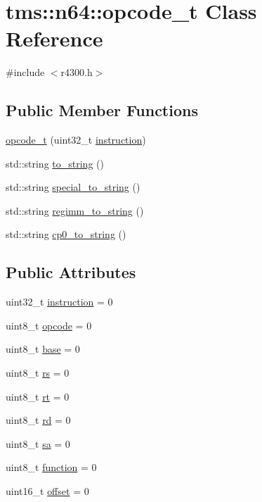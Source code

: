 \hypertarget{classtms_1_1n64_1_1opcode__t}{}\section{tms\+:\+:n64\+:\+:opcode\+\_\+t Class Reference}
\label{classtms_1_1n64_1_1opcode__t}


{\ttfamily \#include $<$r4300.\+h$>$}

\subsection*{Public Member Functions}
\begin{DoxyCompactItemize}
\item 
\hyperlink{classtms_1_1n64_1_1opcode__t_a507801bea9f0304881b0df6ab06778a8}{opcode\+\_\+t} (uint32\+\_\+t \hyperlink{classtms_1_1n64_1_1opcode__t_ac829461bde29e27600f04acdbe811b93}{instruction})
\item 
std\+::string \hyperlink{classtms_1_1n64_1_1opcode__t_ae87f3baac42ff04e2764c2e0e3d90993}{to\+\_\+string} ()
\item 
std\+::string \hyperlink{classtms_1_1n64_1_1opcode__t_a9f846a7b922c7d5adc6a800272bf1718}{special\+\_\+to\+\_\+string} ()
\item 
std\+::string \hyperlink{classtms_1_1n64_1_1opcode__t_ae10da23a28f0fe83ab7d560d27935c59}{regimm\+\_\+to\+\_\+string} ()
\item 
std\+::string \hyperlink{classtms_1_1n64_1_1opcode__t_a2700aae8c42f277c7c5f63639753faae}{cp0\+\_\+to\+\_\+string} ()
\end{DoxyCompactItemize}
\subsection*{Public Attributes}
\begin{DoxyCompactItemize}
\item 
uint32\+\_\+t \hyperlink{classtms_1_1n64_1_1opcode__t_ac829461bde29e27600f04acdbe811b93}{instruction} = 0
\item 
uint8\+\_\+t \hyperlink{classtms_1_1n64_1_1opcode__t_a7495cc6344098fc4099a4af2758df42a}{opcode} = 0
\item 
uint8\+\_\+t \hyperlink{classtms_1_1n64_1_1opcode__t_a37419f208b4383145548c1854689efc4}{base} = 0
\item 
uint8\+\_\+t \hyperlink{classtms_1_1n64_1_1opcode__t_a372ccd6f18d433ff4012cd857d766103}{rs} = 0
\item 
uint8\+\_\+t \hyperlink{classtms_1_1n64_1_1opcode__t_a77740e73e4de347371f8b4770708c30f}{rt} = 0
\item 
uint8\+\_\+t \hyperlink{classtms_1_1n64_1_1opcode__t_a0ad26cd7cb9417597de7c32e6dac4f1e}{rd} = 0
\item 
uint8\+\_\+t \hyperlink{classtms_1_1n64_1_1opcode__t_a01e46aa71d06ff417bc3e3b8aafd9d1f}{sa} = 0
\item 
uint8\+\_\+t \hyperlink{classtms_1_1n64_1_1opcode__t_a63145cf4004d3c54c6d1143d65c679c7}{function} = 0
\item 
uint16\+\_\+t \hyperlink{classtms_1_1n64_1_1opcode__t_a8fdb521cf773fcd68f25382e26fb7817}{offset} = 0
\end{DoxyCompactItemize}
